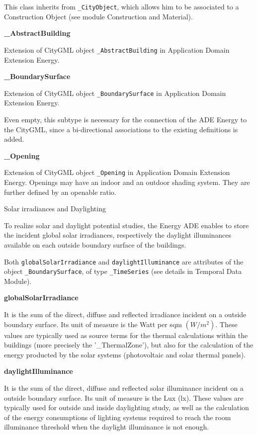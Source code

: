 \documentclass[a4paper,12pt]{article}
\begin{document}
This class inherits from \texttt{\_CityObject}, which allows him to be
associated to a Construction Object (see module Construction and
Material).

\textbf{\_AbstractBuilding}

Extension of CityGML object \texttt{\_AbstractBuilding} in Application
Domain Extension Energy.

\textbf{\_BoundarySurface}

Extension of CityGML object \texttt{\_BoundarySurface} in Application
Domain Extension Energy.

Even empty, this subtype is necessary for the connection of the ADE
Energy to the CityGML, since a bi-directional associations to the
existing definitions is added.

\textbf{\_Opening}

Extension of CityGML object \texttt{\_Opening} in Application Domain
Extension Energy. Openings may have an indoor and an outdoor shading
system. They are further defined by an openable ratio.

Solar irradiances and Daylighting

To realize solar and daylight potential studies, the Energy ADE enables
to store the incident global solar irradiances, respectively the
daylight illuminances available on each outside boundary surface of the
buildings.

Both \texttt{globalSolarIrradiance} and \texttt{daylightIlluminance} are
attributes of the object \texttt{\_BoundarySurface}, of type
\texttt{\_TimeSeries} (see details in Temporal Data Module).

\textbf{globalSolarIrradiance}

It is the sum of the direct, diffuse and reflected irradiance incident
on a outside boundary surface. Its unit of measure is the Watt per sqm
\((W/m^2)\). These values are typically used as source terms for the
thermal calculations within the buildings (more precisely the
'\_ThermalZone'), but also for the calculation of the energy producted
by the solar systems (photovoltaic and solar thermal panels).

\textbf{daylightIlluminance}

It is the sum of the direct, diffuse and reflected solar illuminance
incident on a outside boundary surface. Its unit of measure is the Lux
(lx). These values are typically used for outside and inside daylighting
study, as well as the calculation of the energy consumptions of lighting
systems required to reach the room illuminance threshold when the
daylight illuminance is not enough.
\end{document}

